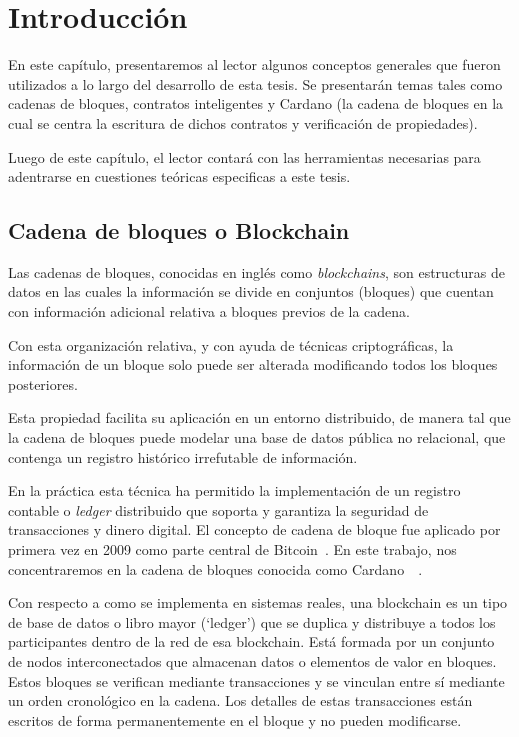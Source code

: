 \documentclass[12pt]{book}
\begin{document}

\chapter{Introducción}

En este capítulo, presentaremos al lector algunos conceptos generales que fueron utilizados a lo largo del desarrollo de esta tesis. Se presentarán temas tales como cadenas de bloques, contratos inteligentes y Cardano (la cadena de bloques en la cual se centra la escritura de dichos contratos y verificación de propiedades).

Luego de este capítulo, el lector contará con las herramientas necesarias para adentrarse en cuestiones teóricas especificas a este tesis.

\section{Cadena de bloques o Blockchain}
Las cadenas de bloques, conocidas en inglés como \textit{blockchains}, son estructuras de datos en las cuales la información se divide en conjuntos (bloques) que cuentan con información adicional relativa a bloques previos de la cadena.

Con esta organización relativa, y con ayuda de técnicas criptográficas, la información de un bloque solo puede ser alterada modificando todos los bloques posteriores.

Esta propiedad facilita su aplicación en un entorno distribuido, de manera tal que la cadena de bloques puede modelar una base de datos pública no relacional, que contenga un registro histórico irrefutable de información.

En la práctica esta técnica ha permitido la implementación de un registro contable o \textit{ledger} distribuido que soporta y garantiza la seguridad de transacciones y dinero digital.
El concepto de cadena de bloque fue aplicado por primera vez en 2009 como parte central de Bitcoin~\cite{nakamoto2008bitcoin}. En este trabajo, nos concentraremos en la cadena de bloques conocida como Cardano~\cite{cardano_website}~\cite{cardano_utxo_ledger}.

Con respecto a como se implementa en sistemas reales, una blockchain es un tipo de base de datos o libro mayor (`ledger') que se duplica y distribuye a todos los participantes dentro de la red de esa blockchain. Está formada por un conjunto de nodos interconectados que almacenan datos o elementos de valor en bloques. Estos bloques se verifican mediante transacciones y se vinculan entre sí mediante un orden cronológico en la cadena. Los detalles de estas transacciones están escritos de forma permanentemente en el bloque y no pueden modificarse.
\end{document}
